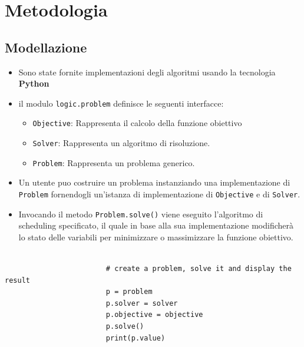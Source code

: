\documentclass[compress]{beamer}
\begin{document}
\section{Metodologia}
    \subsection{Modellazione}
    
    \begin{frame}{\subsecname}

            \begin{itemize}
                \item Sono state fornite implementazioni degli algoritmi usando
                la tecnologia \textbf{Python}
                \item il modulo \texttt{logic.problem} definisce le seguenti interfacce:
                \begin{itemize}
                    \item \texttt{Objective}: Rappresenta il calcolo della funzione obiettivo
                    \item \texttt{Solver}: Rappresenta un algoritmo di risoluzione.
                    \item \texttt{Problem}: Rappresenta un problema generico.
                \end{itemize}
            \end{itemize}

    \end{frame}

    \begin{frame}[fragile]{\subsecname}
        \begin{itemize}
        \item Un utente puo costruire un problema instanziando una implementazione
        di \texttt{Problem} fornendogli un'istanza di implementazione di \texttt{Objective}
        e di \texttt{Solver}.
        \item Invocando il metodo \texttt{Problem.solve()} viene eseguito 
            l'algoritmo di scheduling specificato, il quale in base alla sua implementazione
            modificherà lo stato delle variabili per minimizzare o massimizzare la funzione obiettivo.    
        \end{itemize}    
                \begin{center}
                    \begin{verbatim}
                        
                        # create a problem, solve it and display the result
                        p = problem
                        p.solver = solver
                        p.objective = objective
                        p.solve()
                        print(p.value)
                    \end{verbatim}
                \end{center}        
    \end{frame}
\end{document}
